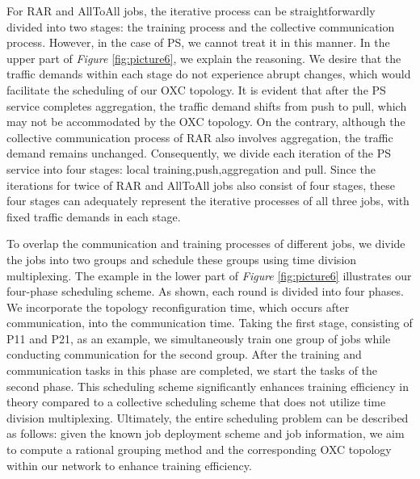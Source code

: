 \documentclass[conference]{IEEEtran}
\begin{document}
For RAR and AllToAll jobs, the iterative process can be straightforwardly divided into two stages: the training process and the collective communication process. However, in the case of PS, we cannot treat it in this manner. In the upper part of \emph{Figure} \ref{fig:picture6}, we explain the reasoning. We desire that the traffic demands within each stage do not experience abrupt changes, which would facilitate the scheduling of our OXC topology. It is evident that after the PS service completes aggregation, the traffic demand shifts from push to pull, which may not be accommodated by the OXC topology. On the contrary, although the collective communication process of RAR also involves aggregation, the traffic demand remains unchanged. Consequently, we divide each iteration of the PS service into four stages: local training,push,aggregation and pull. Since the iterations for twice of RAR and AllToAll jobs also consist of four stages, these four stages can adequately represent the iterative processes of all three jobs, with fixed traffic demands in each stage.


To overlap the communication and training processes of different jobs, we divide the jobs into two groups and schedule these groups using time division multiplexing. The example in the lower part of \emph{Figure} \ref{fig:picture6} illustrates our four-phase scheduling scheme. As shown, each round is divided into four phases. We incorporate the topology reconfiguration time, which occurs after communication, into the communication time. Taking the first stage, consisting of P11 and P21, as an example, we simultaneously train one group of jobs while conducting communication for the second group. After the training and communication tasks in this phase are completed, we start the tasks of the second phase. This scheduling scheme significantly enhances training efficiency in theory compared to a collective scheduling scheme that does not utilize time division multiplexing. Ultimately, the entire scheduling problem can be described as follows: given the known job deployment scheme and job information, we aim to compute a rational grouping method and the corresponding OXC topology within our network to enhance training efficiency.
\end{document}
